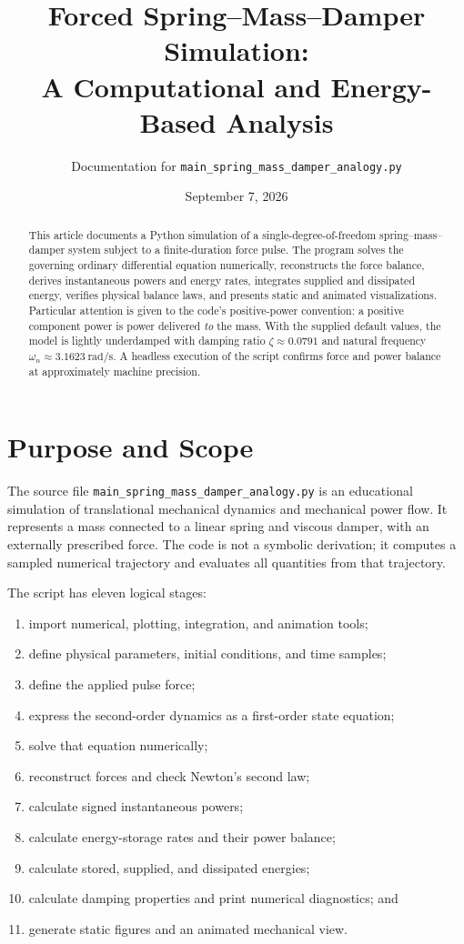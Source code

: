 \documentclass[11pt]{article}
\title{Forced Spring--Mass--Damper Simulation: \\ A Computational and Energy-Based Analysis}
\author{Documentation for \texttt{main\_spring\_mass\_damper\_analogy.py}}
\date{September 7, 2026}
\begin{document}
\maketitle

\begin{abstract}
This article documents a Python simulation of a single-degree-of-freedom spring--mass--damper system subject to a finite-duration force pulse. The program solves the governing ordinary differential equation numerically, reconstructs the force balance, derives instantaneous powers and energy rates, integrates supplied and dissipated energy, verifies physical balance laws, and presents static and animated visualizations. Particular attention is given to the code's positive-power convention: a positive component power is power delivered \emph{to} the mass. With the supplied default values, the model is lightly underdamped with damping ratio $\zeta\approx0.0791$ and natural frequency $\omega_n\approx3.1623\ \mathrm{rad/s}$. A headless execution of the script confirms force and power balance at approximately machine precision.
\end{abstract}

\section{Purpose and Scope}
The source file \texttt{main\_spring\_mass\_damper\_analogy.py} is an educational simulation of translational mechanical dynamics and mechanical power flow. It represents a mass connected to a linear spring and viscous damper, with an externally prescribed force. The code is not a symbolic derivation; it computes a sampled numerical trajectory and evaluates all quantities from that trajectory.

The script has eleven logical stages:
\begin{enumerate}
  \item import numerical, plotting, integration, and animation tools;
  \item define physical parameters, initial conditions, and time samples;
  \item define the applied pulse force;
  \item express the second-order dynamics as a first-order state equation;
  \item solve that equation numerically;
  \item reconstruct forces and check Newton's second law;
  \item calculate signed instantaneous powers;
  \item calculate energy-storage rates and their power balance;
  \item calculate stored, supplied, and dissipated energies;
  \item calculate damping properties and print numerical diagnostics; and
  \item generate static figures and an animated mechanical view.
\end{enumerate}
\end{document}
